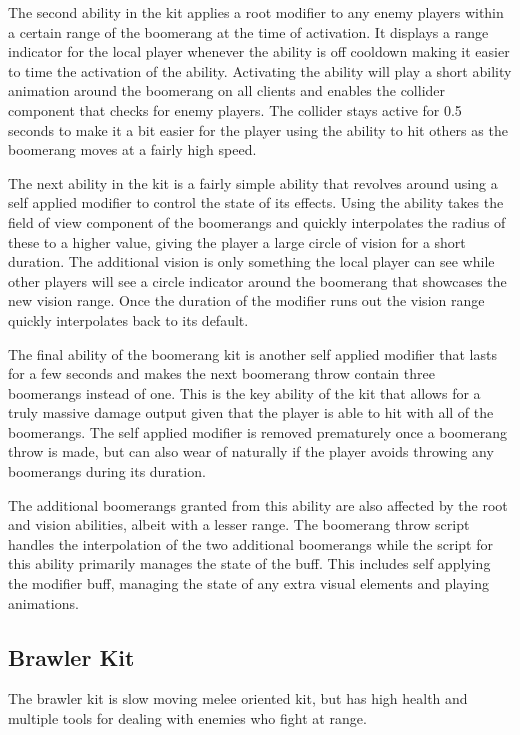 The second ability in the kit applies a root modifier to any enemy players within a certain range of the boomerang at the time of activation. It displays a range indicator for the local player whenever the ability is off cooldown making it easier to time the activation of the ability. Activating the ability will play a short ability animation around the boomerang on all clients and enables the collider component that checks for enemy players. The collider stays active for 0.5 seconds to make it a bit easier for the player using the ability to hit others as the boomerang moves at a fairly high speed. 
    
The next ability in the kit is a fairly simple ability that revolves around using a self applied modifier to control the state of its effects. Using the ability takes the field of view component of the boomerangs and quickly interpolates the radius of these to a higher value, giving the player a large circle of vision for a short duration. The additional vision is only something the local player can see while other players will see a circle indicator around the boomerang that showcases the new vision range. Once the duration of the modifier runs out the vision range quickly interpolates back to its default. 

The final ability of the boomerang kit is another self applied modifier that lasts for a few seconds and makes the next boomerang throw contain three boomerangs instead of one. This is the key ability of the kit that allows for a truly massive damage output given that the player is able to hit with all of the boomerangs. The self applied modifier is removed prematurely once a boomerang throw is made, but can also wear of naturally if the player avoids throwing any boomerangs during its duration. 

The additional boomerangs granted from this ability are also affected by the root and vision abilities, albeit with a lesser range. The boomerang throw script handles the interpolation of the two additional boomerangs while the script for this ability primarily manages the state of the buff. This includes self applying the modifier buff, managing the state of any extra visual elements and playing animations. 
    

\subsection{Brawler Kit}
The brawler kit is slow moving melee oriented kit, but has high health and multiple tools for dealing with enemies who fight at range. 

